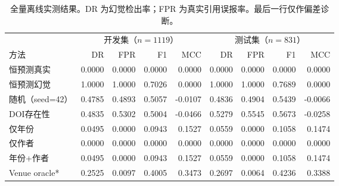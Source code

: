 \begin{table}[htbp]
\centering\small
\caption{全量离线实测结果。DR 为幻觉检出率；FPR 为真实引用误报率。最后一行仅作偏差诊断。}
\label{tab:offline-results}
\begin{tabular}{lrrrrrrrr}
\toprule
 & \multicolumn{4}{c}{开发集（$n=1119$）} & \multicolumn{4}{c}{测试集（$n=831$）}\\
方法 & DR & FPR & F1 & MCC & DR & FPR & F1 & MCC\\
\midrule
恒预测真实 & 0.0000 & 0.0000 & 0.0000 & 0.0000 & 0.0000 & 0.0000 & 0.0000 & 0.0000\\
恒预测幻觉 & 1.0000 & 1.0000 & 0.7026 & 0.0000 & 1.0000 & 1.0000 & 0.7689 & 0.0000\\
随机（seed=42） & 0.4785 & 0.4893 & 0.5057 & -0.0107 & 0.4836 & 0.4904 & 0.5439 & -0.0066\\
DOI存在性 & 0.4835 & 0.5302 & 0.5004 & -0.0466 & 0.5279 & 0.5545 & 0.5673 & -0.0258\\
仅年份 & 0.0495 & 0.0000 & 0.0943 & 0.1527 & 0.0559 & 0.0000 & 0.1058 & 0.1474\\
仅作者 & 0.0000 & 0.0000 & 0.0000 & 0.0000 & 0.0000 & 0.0000 & 0.0000 & 0.0000\\
年份+作者 & 0.0495 & 0.0000 & 0.0943 & 0.1527 & 0.0559 & 0.0000 & 0.1058 & 0.1474\\
Venue oracle* & 0.2525 & 0.0097 & 0.4005 & 0.3473 & 0.2697 & 0.0064 & 0.4236 & 0.3388\\
\bottomrule
\end{tabular}
\end{table}
